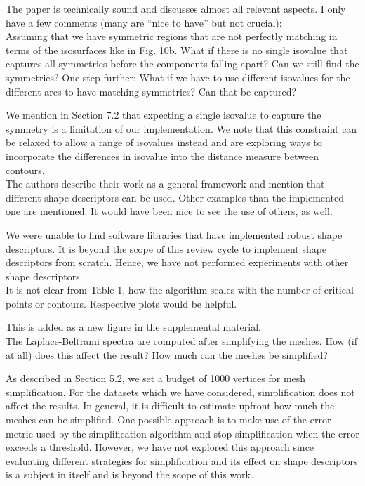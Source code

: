 \documentclass[10pt]{article}
\begin{document}
   The paper is technically sound and discusses almost all relevant aspects.
   I only have a few comments (many are ``nice to have'' but not crucial):\\

   Assuming that we have symmetric regions that are not perfectly matching
   in terms of the isosurfaces like in Fig. 10b. What if there is no single
   isovalue that captures all symmetries before the components falling
   apart? Can we still find the symmetries? One step further: What if we
   have to use different isovalues for the different arcs to have matching
   symmetries? Can that be captured?

   {\color{blue}We mention in Section 7.2 that expecting a single isovalue
	to capture the symmetry is a limitation of our
	   implementation. We note that this constraint can be relaxed to allow
	   a range of isovalues instead and are exploring ways to incorporate
   the differences in isovalue into the distance measure between contours.}\\
   
   The authors describe their work as a general framework and mention that
   different shape descriptors can be used. Other examples than the
   implemented one are mentioned. It would have been nice to see the use of
   others, as well. 

   {\color{blue} We were unable to find software libraries that have implemented
	robust shape descriptors. It is beyond the scope of this review cycle
	to implement shape descriptors from scratch. Hence, we have not
performed experiments with other shape descriptors.}\\

   It is not clear from Table 1, how the algorithm scales with the number
   of critical points or contours. Respective plots would be helpful.

   {\color{blue}This is added as a new figure in the supplemental material.}\\

   The Laplace-Beltrami spectra are computed after simplifying the meshes.
   How (if at all) does this affect the result? How much can the meshes be
   simplified?

   {\color{blue}As described in Section 5.2, we set a budget of 1000 vertices
	   for mesh simplification. For the datasets which we have considered,
	   simplification does not affect the results. In general, it is difficult
	   to estimate upfront how much the meshes can be simplified. One possible approach
	   is to make use of the error metric used by the simplification algorithm
	   and stop simplification when the error exceeds a threshold. However, we have
	   not explored this approach since evaluating different strategies for simplification
	   and its effect on shape descriptors is a subject in itself and is beyond the scope
   of this work.}\\
\end{document}
